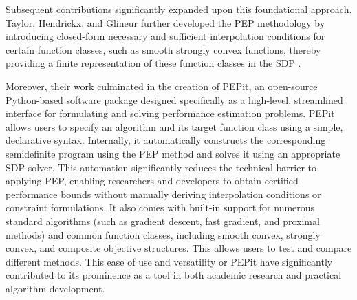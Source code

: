 Subsequent contributions significantly expanded upon this foundational approach. Taylor, Hendrickx, and Glineur further developed the PEP methodology by introducing closed-form necessary and sufficient interpolation conditions for certain function classes, such as smooth strongly convex functions, thereby providing a finite representation of these function classes in the SDP \cite{pepit}.


Moreover, their work culminated in the creation of PEPit, an open-source Python-based software package designed specifically as a high-level, streamlined interface for formulating and solving performance estimation problems. PEPit allows users to specify an algorithm and its target function class using a simple, declarative syntax. Internally, it automatically constructs the corresponding semidefinite program using the PEP method and solves it using an appropriate SDP solver. This automation significantly reduces the technical barrier to applying PEP, enabling researchers and developers to obtain certified performance bounds without manually deriving interpolation conditions or constraint formulations. It also comes with built-in support for numerous standard algorithms (such as gradient descent, fast gradient, and proximal methods) and common function classes, including smooth convex, strongly convex, and composite objective structures. This allows users to test and compare different methods. This ease of use and versatility or PEPit have significantly contributed to its prominence as a tool in both academic research and practical algorithm development.

